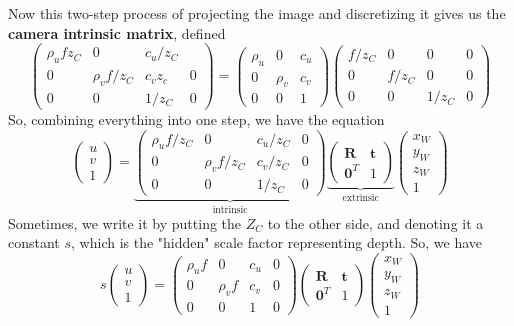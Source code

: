 \documentclass{article}
\theoremstyle{definition}
\theoremstyle{remark}
\theoremstyle{definition}
\begin{document}
Now this two-step process of projecting the image and discretizing it gives us the \textbf{camera intrinsic matrix}, defined 
\[\begin{pmatrix} \rho_u f z_C & 0 & c_u / z_C \\ 
0 & \rho_v f / z_C & c_v z_c & 0 \\ 
0 & 0 & 1/z_C & 0 \end{pmatrix} = \begin{pmatrix} \rho_u  & 0 & c_u \\ 0 & \rho_v & c_v \\ 0 & 0 & 1 \end{pmatrix} \begin{pmatrix} f/z_C & 0 & 0 & 0 \\ 0 & f/z_C & 0 & 0 \\ 0 & 0 & 1/z_C & 0 \end{pmatrix} \]
So, combining everything into one step, we have the equation 
\[\begin{pmatrix} u \\ v \\ 1 \end{pmatrix} = \underbrace{\begin{pmatrix} \rho_u f / z_C & 0 & c_u / z_C & 0\\ 
0 & \rho_v f / z_C & c_v / z_C & 0 \\ 
0 & 0 & 1/z_C & 0 \end{pmatrix}}_{\text{intrinsic}} \underbrace{\begin{pmatrix} \mathbf{R} & \mathbf{t} \\ \mathbf{0}^T & 1 \end{pmatrix}}_{\text{extrinsic}} \begin{pmatrix} x_W \\ y_W \\ z_W \\ 1 \end{pmatrix}\]
Sometimes, we write it by putting the $Z_C$ to the other side, and denoting it a constant $s$, which is the "hidden" scale factor representing depth. So, we have 
\[ s \begin{pmatrix} u \\ v \\ 1 \end{pmatrix} = \begin{pmatrix} \rho_u f & 0 & c_u & 0\\ 
0 & \rho_v f & c_v & 0 \\ 
0 & 0 & 1 & 0 \end{pmatrix} \begin{pmatrix} \mathbf{R} & \mathbf{t} \\ \mathbf{0}^T & 1 \end{pmatrix} \begin{pmatrix} x_W \\ y_W \\ z_W \\ 1 \end{pmatrix}\]
\end{document}
